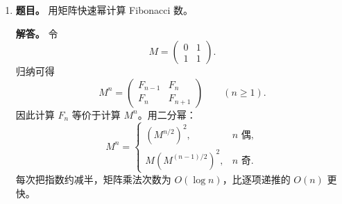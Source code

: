 ﻿\documentclass[UTF8,12pt]{ctexart}
\begin{document}
\begin{enumerate}[label=\textbf{\arabic*.},leftmargin=2.2em]
\item \textbf{题目。} 用矩阵快速幂计算 Fibonacci 数。

\textbf{解答。} 令
\[
M=\begin{pmatrix}0&1\\1&1\end{pmatrix}.
\]
归纳可得
\[
M^n=
\begin{pmatrix}
F_{n-1}&F_n\\
F_n&F_{n+1}
\end{pmatrix}\qquad(n\ge1).
\]
因此计算 \(F_n\) 等价于计算 \(M^n\)。用二分幂：
\[
M^n=\begin{cases}
(M^{n/2})^2,&n\text{ 偶},\\
M(M^{(n-1)/2})^2,&n\text{ 奇}.
\end{cases}
\]
每次把指数约减半，矩阵乘法次数为 \(O(\log n)\)，比逐项递推的 \(O(n)\) 更快。
\end{enumerate}
\end{document}
